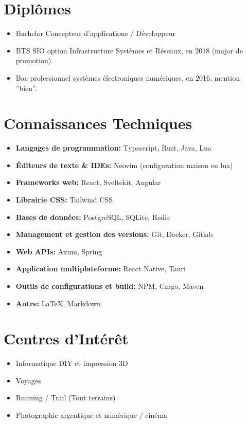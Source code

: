 \documentclass[10pt,a4paper,oneside]{article}
\begin{document}
\begin{multicols}{2}
\section*{Diplômes}
\begin{itemize}
    \item Bachelor Concepteur d’applications / Développeur
    \item BTS SIO option Infrastructure Systèmes et Réseaux, en 2018 (major de promotion).
    \item Bac professionnel systèmes électroniques numériques, en 2016, mention ”bien”.
\end{itemize}

\section*{Connaissances Techniques}
\begin{itemize}
    \item \textbf{Langages de programmation:} Typescript, Rust, Java, Lua
    \item \textbf{Éditeurs de texte \& IDEs:} Neovim (configuration maison en lua)
    \item \textbf{Frameworks web:} React, Sveltekit, Angular
    \item \textbf{Librairie CSS:} Tailwind CSS
    \item \textbf{Bases de données:} PostgreSQL, SQLite, Redis
    \item \textbf{Management et gestion des versions:} Git, Docker, Gitlab
    \item \textbf{Web APIs:} Axum, Spring
    \item \textbf{Application multiplateforme:} React Native, Tauri
    \item \textbf{Outils de configurations et build:} NPM, Cargo, Maven
    \item \textbf{Autre:} LaTeX, Markdown
\end{itemize}

\section*{Centres d’Intérêt}
\begin{itemize}
    \item Informatique DIY et impression 3D
    \item Voyages
    \item Running / Trail (Tout terrains)
    \item Photographie argentique et numérique / cinéma
\end{itemize}

\end{multicols}
\end{document}
